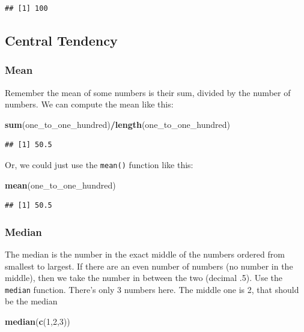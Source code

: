 \documentclass[]{book}
\newenvironment{Shaded}{\begin{snugshade}}{\end{snugshade}}
\newcommand{\KeywordTok}[1]{\textcolor[rgb]{0.13,0.29,0.53}{\textbf{#1}}}
\newcommand{\DecValTok}[1]{\textcolor[rgb]{0.00,0.00,0.81}{#1}}
\newcommand{\OperatorTok}[1]{\textcolor[rgb]{0.81,0.36,0.00}{\textbf{#1}}}
\newcommand{\NormalTok}[1]{#1}
\begin{document}
\begin{verbatim}
## [1] 100
\end{verbatim}

\subsection{Central Tendency}\label{central-tendency}

\subsubsection{Mean}\label{mean}

Remember the mean of some numbers is their sum, divided by the number of
numbers. We can compute the mean like this:

\begin{Shaded}
\begin{Highlighting}[]
\KeywordTok{sum}\NormalTok{(one_to_one_hundred)}\OperatorTok{/}\KeywordTok{length}\NormalTok{(one_to_one_hundred)}
\end{Highlighting}
\end{Shaded}

\begin{verbatim}
## [1] 50.5
\end{verbatim}

Or, we could just use the \texttt{mean()} function like this:

\begin{Shaded}
\begin{Highlighting}[]
\KeywordTok{mean}\NormalTok{(one_to_one_hundred)}
\end{Highlighting}
\end{Shaded}

\begin{verbatim}
## [1] 50.5
\end{verbatim}

\subsubsection{Median}\label{median}

The median is the number in the exact middle of the numbers ordered from
smallest to largest. If there are an even number of numbers (no number
in the middle), then we take the number in between the two (decimal .5).
Use the \texttt{median} function. There's only 3 numbers here. The
middle one is 2, that should be the median

\begin{Shaded}
\begin{Highlighting}[]
\KeywordTok{median}\NormalTok{(}\KeywordTok{c}\NormalTok{(}\DecValTok{1}\NormalTok{,}\DecValTok{2}\NormalTok{,}\DecValTok{3}\NormalTok{))}
\end{Highlighting}
\end{Shaded}
\end{document}
